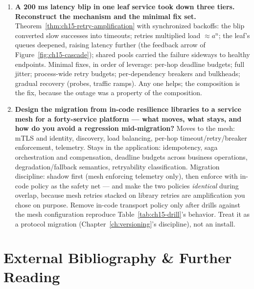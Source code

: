 \begin{enumerate}[label=\textbf{Q\arabic*.}, leftmargin=1.6cm, start=28]
        prove the behavior.
  \item \textbf{A 200 ms latency blip in one leaf service took down three
        tiers. Reconstruct the mechanism and the minimal fix set.}
        Theorem~\ref{thm:ch15-retry-amplification} with synchronized
        backoffs: the blip converted slow successes into timeouts; retries
        multiplied load $\approx a^{n}$; the leaf's queues deepened,
        raising latency further (the feedback arrow of
        Figure~\ref{fig:ch15-cascade}); shared pools carried the failure
        sideways to healthy endpoints. Minimal fixes, in order of leverage:
        per-hop deadline budgets; full jitter; process-wide retry budgets;
        per-dependency breakers and bulkheads; gradual recovery (probes,
        traffic ramps). Any one helps; the composition is the fix, because
        the outage was a property of the composition.
  \item \textbf{Design the migration from in-code resilience libraries to
        a service mesh for a forty-service platform --- what moves, what
        stays, and how do you avoid a regression mid-migration?}
        Moves to the mesh: mTLS and identity, discovery, load balancing,
        per-hop timeout/retry/breaker enforcement, telemetry. Stays in the
        application: idempotency, saga orchestration and compensation,
        deadline budgets across business operations, degradation/fallback
        semantics, retryability classification. Migration discipline:
        shadow first (mesh enforcing telemetry only), then enforce with
        in-code policy as the safety net --- and make the two policies
        \emph{identical} during overlap, because mesh retries stacked on
        library retries are amplification you chose on purpose. Remove
        in-code transport policy only after drills against the mesh
        configuration reproduce Table~\ref{tab:ch15-drill}'s behavior.
        Treat it as a protocol migration
        (Chapter~\ref{ch:versioning}'s discipline), not an install.
\end{enumerate}

\section{External Bibliography \& Further Reading}
\label{sec:ch15-bibliography}

